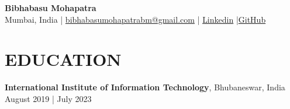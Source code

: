 \documentclass[a4paper,10pt]{extarticle}
\begin{document}
\pagecolor{bgRGB}
\pagestyle{empty}

\begin{center}
\textbf{\huge \textbf{Bibhabasu Mohapatra}}\\[4pt] %
Mumbai, India | \href{mailto:bibhabasumohapatrabm@gmail.com}{bibhabasumohapatrabm@gmail.com} | \href{https://www.linkedin.com/in/bibhabasu-mohapatra-3b8205193/}{Linkedin} |\href{https://github.com/bibhabasumohapatra}{GitHub}  %
\end{center}

\section*{EDUCATION}
\noindent
\textbf{International Institute of Information Technology}, Bhubaneswar, India \hfill August 2019 | July 2023\\ %
\end{document}
